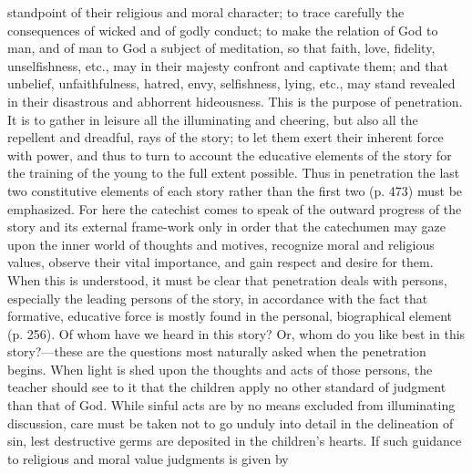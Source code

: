 standpoint of their religious and moral character; to trace carefully the consequences of wicked and of godly conduct; to make the relation of God to man, and of man to God a subject of meditation, so that faith, love, fidelity, unselfishness, etc., may in their majesty confront and captivate them; and that unbelief, unfaithfulness, hatred, envy, selfishness, lying, etc., may stand revealed in their disastrous and abhorrent hideousness. This is the purpose of penetration. It is to gather in leisure all the illuminating and cheering, but also all the repellent and dreadful, rays of the story; to let them exert their inherent force with power, and thus to turn to account the educative elements of the story for the training of the young to the full extent possible. Thus in penetration the last two constitutive elements of each story rather than the first two (p. 473) must be emphasized. For here the catechist comes to speak of the outward progress of the story and its external frame-work only in order that the catechumen may gaze upon the inner world of thoughts and motives, recognize moral and religious values, observe their vital importance, and gain respect and desire for them. When this is understood, it must be clear that penetration deals with persons, especially the leading persons of the story, in accordance with the fact that formative, educative force is mostly found in the personal, biographical element (p. 256). Of whom have we heard in this story? Or, whom do you like best in this story?—these are the questions most naturally asked when the penetration begins. When light is shed upon the thoughts and acts of those persons, the teacher should see to it that the children apply no other standard of judgment than that of God. While sinful acts are by no means excluded from illuminating discussion, care must be taken not to go unduly into detail in the delineation of sin, lest destructive germs are deposited in the children’s hearts. If such guidance to religious and moral value judgments is given by
